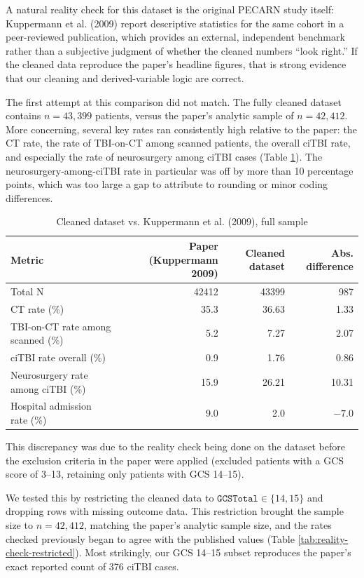 \documentclass[10pt,letterpaper]{article}
\begin{document}
A natural reality check for this dataset is the original PECARN study itself: Kuppermann et al.
(2009) report descriptive statistics for the same cohort in a peer-reviewed publication, which
provides an external, independent benchmark rather than a subjective judgment of whether the cleaned
numbers ``look right.'' If the cleaned data reproduce the paper's headline figures, that is strong
evidence that our cleaning and derived-variable logic are correct.

The first attempt at this comparison did not match. The fully cleaned dataset contains
$n = 43{,}399$ patients, versus the paper's analytic sample of $n = 42{,}412$. More concerning, several key rates ran consistently high relative to the paper: the
CT rate, the rate of TBI-on-CT among scanned patients, the overall ciTBI rate, and especially the
rate of neurosurgery among ciTBI cases (Table \ref{tab:reality-check-initial}). The
neurosurgery-among-ciTBI rate in particular was off by more than 10 percentage points, which was
too large a gap to attribute to rounding or minor coding differences.

\begin{table}[h]
\centering
\caption{Cleaned dataset vs. Kuppermann et al. (2009), full sample}
\label{tab:reality-check-initial}
\begin{tabular}{lrrr}
\toprule
Metric & Paper (Kuppermann 2009) & Cleaned dataset & Abs. difference \\
\midrule
Total N & 42412 & 43399 & 987 \\
CT rate (\%) & 35.3 & 36.63 & 1.33 \\
TBI-on-CT rate among scanned (\%) & 5.2 & 7.27 & 2.07 \\
ciTBI rate overall (\%) & 0.9 & 1.76 & 0.86 \\
Neurosurgery rate among ciTBI (\%) & 15.9 & 26.21 & 10.31 \\
Hospital admission rate (\%) & 9.0 & 2.0 & $-7.0$ \\
\bottomrule
\end{tabular}
\end{table}

This discrepancy was due to the reality check being done on the dataset before the exclusion criteria in the paper were applied (excluded patients with a GCS score of 3--13, retaining only patients with GCS 14--15). 

We tested this by restricting the cleaned data to $\texttt{GCSTotal} \in \{14, 15\}$ and
dropping rows with missing outcome data. This restriction brought the sample size to 
$n = 42{,}412$, matching the paper's analytic sample size, and the rates checked previously began to agree with the published values (Table
\ref{tab:reality-check-restricted}). Most strikingly, our GCS 14--15 subset reproduces the paper's
exact reported count of 376 ciTBI cases.
\end{document}
